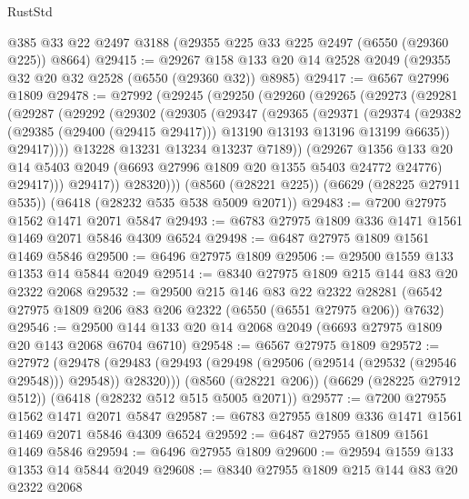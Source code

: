 \begin{lexlean}{RustStd}
\begin{coremodule}
    @385
    @33
    @22
    @2497
    @3188
    (@29355 @225 @33 @225 @2497 (@6550 (@29360 @225)) @8664)
@29415 := @29267 @158 @133 @20 @14 @2528 @2049 (@29355 @32 @20 @32 @2528 (@6550 (@29360 @32)) @8985)
@29417 := @6567 @27996 @1809
@29478 := @27992
    (@29245
      (@29250
        (@29260
          (@29265
            (@29273
              (@29281
                (@29287
                  (@29292
                    (@29302
                      (@29305
                        (@29347
                          (@29365
                            (@29371
                              (@29374
                                (@29382
                                  (@29385 (@29400 (@29415 @29417)))
                                  @13190
                                  @13193
                                  @13196
                                  @13199
                                  @6635))
                              @29417))))
                      @13228
                      @13231
                      @13234
                      @13237
                      @7189))
                  (@29267
                    @1356
                    @133
                    @20
                    @14
                    @5403
                    @2049
                    (@6693 @27996 @1809 @20 @1355 @5403 @24772 @24776)
                    @29417)))
              @29417))
          @28320)))
    (@8560 (@28221 @225))
    (@6629 (@28225 @27911 @535))
    (@6418 (@28232 @535 @538 @5009 @2071))
@29483 := @7200 @27975 @1562 @1471 @2071 @5847
@29493 := @6783 @27975 @1809 @336 @1471 @1561 @1469 @2071 @5846 @4309 @6524
@29498 := @6487 @27975 @1809 @1561 @1469 @5846
@29500 := @6496 @27975 @1809
@29506 := @29500 @1559 @133 @1353 @14 @5844 @2049
@29514 := @8340 @27975 @1809 @215 @144 @83 @20 @2322 @2068
@29532 := @29500
    @215
    @146
    @83
    @22
    @2322
    @28281
    (@6542 @27975 @1809 @206 @83 @206 @2322 (@6550 (@6551 @27975 @206)) @7632)
@29546 := @29500 @144 @133 @20 @14 @2068 @2049 (@6693 @27975 @1809 @20 @143 @2068 @6704 @6710)
@29548 := @6567 @27975 @1809
@29572 := @27972
    (@29478 (@29483 (@29493 (@29498 (@29506 (@29514 (@29532 (@29546 @29548))) @29548)) @28320)))
    (@8560 (@28221 @206))
    (@6629 (@28225 @27912 @512))
    (@6418 (@28232 @512 @515 @5005 @2071))
@29577 := @7200 @27955 @1562 @1471 @2071 @5847
@29587 := @6783 @27955 @1809 @336 @1471 @1561 @1469 @2071 @5846 @4309 @6524
@29592 := @6487 @27955 @1809 @1561 @1469 @5846
@29594 := @6496 @27955 @1809
@29600 := @29594 @1559 @133 @1353 @14 @5844 @2049
@29608 := @8340 @27955 @1809 @215 @144 @83 @20 @2322 @2068

\end{coremodule}
\end{lexlean}
